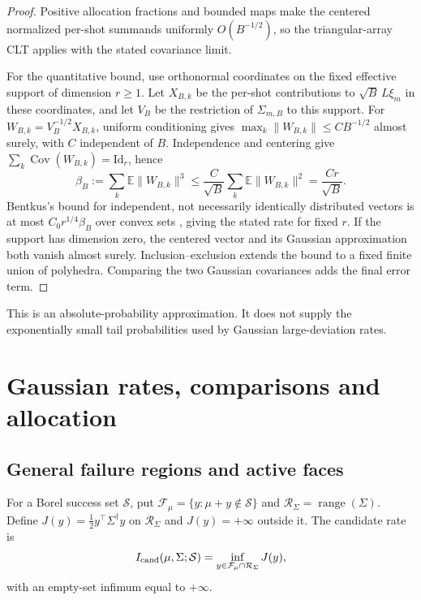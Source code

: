 \documentclass[a4paper,onecolumn,unpublished,nopdfoutputerror]{quantumarticle}
\theoremstyle{plain}
\theoremstyle{definition}
\newcommand{\E}{\mathbb{E}}
\newcommand{\Cov}{\operatorname{Cov}}
\newcommand{\calR}{\mathcal{R}}
\newcommand{\calS}{\mathcal{S}}
\newcommand{\calF}{\mathcal{F}}
\newcommand{\1}{\mathbf{1}}
\begin{document}
\begin{proof}
Positive allocation fractions and bounded maps make the centered normalized per-shot summands uniformly $O(B^{-1/2})$, so the triangular-array CLT applies with the stated covariance limit.

For the quantitative bound, use orthonormal coordinates on the fixed effective support of dimension $r\ge1$. Let $X_{B,k}$ be the per-shot contributions to $\sqrt B\,L\xi_m$ in these coordinates, and let $V_B$ be the restriction of $\Sigma_{m,B}$ to this support. For $W_{B,k}=V_B^{-1/2}X_{B,k}$, uniform conditioning gives $\max_k\|W_{B,k}\|\le C B^{-1/2}$ almost surely, with $C$ independent of $B$. Independence and centering give $\sum_k\Cov(W_{B,k})=\mathrm{Id}_r$, hence
\[
\beta_B:=\sum_k\E\|W_{B,k}\|^3
\le\frac{C}{\sqrt B}\sum_k\E\|W_{B,k}\|^2
=\frac{Cr}{\sqrt B}.
\]
Bentkus's bound for independent, not necessarily identically distributed vectors is at most $C_0r^{1/4}\beta_B$ over convex sets \cite{Bentkus2005}, giving the stated rate for fixed $r$. If the support has dimension zero, the centered vector and its Gaussian approximation both vanish almost surely. Inclusion--exclusion extends the bound to a fixed finite union of polyhedra. Comparing the two Gaussian covariances adds the final error term.
\end{proof}

This is an absolute-probability approximation. It does not supply the exponentially small tail probabilities used by Gaussian large-deviation rates.

\section{Gaussian rates, comparisons and allocation}
\label{app:gaussian_proofs}

\subsection{General failure regions and active faces}
For a Borel success set $\calS$, put $\calF_\mu=\{y:\mu+y\notin\calS\}$ and $\calR_\Sigma=\operatorname{range}(\Sigma)$. Define $J(y)=\tfrac12 y^\top\Sigma^\dagger y$ on $\calR_\Sigma$ and $J(y)=+\infty$ outside it. The candidate rate is
\begin{equation}\label{eq:decision_exponent}
I_{\rm cand}(\mu,\Sigma;\calS)=\inf_{y\in\calF_\mu\cap\calR_\Sigma}J(y),
\end{equation}
with an empty-set infimum equal to $+\infty$.
\end{document}
